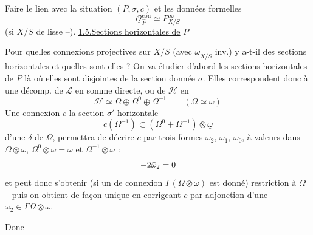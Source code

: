 Faire le lien avec la situation $(P,\sigma,c)$ et les données formelles
\[
\underline{\mathcal{O}}_{\widehat P}^{\mathrm{con}}\simeq P^\infty_{X/S}
\]
(si $X/S$ de  lisse --).
\uline{1.5.}\quad\uline{Sections horizontales de} $P$

Pour quelles connexions projectives sur $X/S$ (avec $\underline{\omega}_{X/S}$ inv.) y a-t-il des sections horizontales  et quelles sont-elles ? On va étudier d'abord les sections horizontales de $P$ là où elles sont disjointes de la section donnée $\sigma$. Elles correspondent donc à une décomp. de $\mathcal{L}$ en somme directe, ou de $\mathcal{H}$ en
\[
\mathcal{H}\simeq\Omega\oplus\Omega^0\oplus\Omega^{-1}\qquad(\Omega\simeq\omega)
\]
 Une connexion $c$  la section $\sigma'$ horizontale  
\[
c(\Omega^{-1})\subset(\Omega^0+\Omega^{-1})\otimes\underline{\omega}
\]
 d'une  $\delta$ de $\Omega$, permettra de décrire $c$ par trois formes $\bar\omega_2$, $\bar\omega_1$, $\bar\omega_0$, à valeurs dans $\Omega\otimes\underline{\omega}$, $\Omega^0\otimes\underline{\omega}=\underline{\omega}$ et $\Omega^{-1}\otimes\underline{\omega}$ :
\[
-{2}\bar\omega_2=0
\]
 et peut donc s'obtenir (si un  de connexion  $\Gamma(\Omega\otimes\omega)$ est donné)    restriction à $\Omega$ -- puis on obtient de façon unique en corrigeant $c$ par adjonction d'une $\omega_2\in\Gamma\Omega\otimes\underline{\omega}$.

Donc

